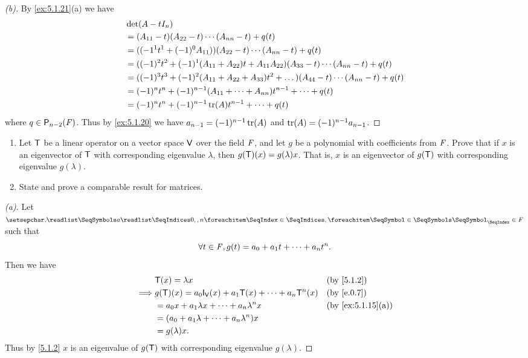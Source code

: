 \begin{proof}[(b)]
	By \cref{ex:5.1.21}(a) we have
	\begin{align*}
		 & \det(A - t I_n)                                                                                             \\
		 & = (A_{1 1} - t) (A_{2 2} - t) \cdots (A_{n n} - t) + q(t)                                                   \\
		 & = ((-1^1 t^1 + (-1)^0 A_{1 1})) (A_{2 2} - t) \cdots (A_{n n} - t) + q(t)                                   \\
		 & = ((-1)^2 t^2 + (-1)^1 (A_{1 1} + A_{2 2}) t + A_{1 1} A_{2 2}) (A_{3 3} - t) \cdots (A_{n n} - t) + q(t)   \\
		 & = ((-1)^3 t^3 + (-1)^2 (A_{1 1} + A_{2 2} + A_{3 3}) t^2 + \dots) (A_{4 4} - t) \cdots (A_{n n} - t) + q(t) \\
		 & = (-1)^n t^n + (-1)^{n - 1} (A_{1 1} + \cdots + A_{n n}) t^{n - 1} + \cdots + q(t)                          \\
		 & = (-1)^n t^n + (-1)^{n - 1} \tr(A) t^{n - 1} + \cdots + q(t)
	\end{align*}
	where \(q \in \ps[n - 2]{\F}\).
	Thus by \cref{ex:5.1.20} we have \(a_{n - 1} = (-1)^{n - 1} \tr(A)\) and \(\tr(A) = (-1)^{n - 1} a_{n - 1}\).
\end{proof}

\begin{ex}\label{ex:5.1.22}
	\begin{enumerate}
		\item Let \(\mathsf{T}\) be a linear operator on a vector space \(\mathsf{V}\) over the field \(\mathit{F}\), and let \(g\) be a polynomial with coefficients from \(\mathit{F}\).
		      Prove that if \(x\) is an eigenvector of \(\mathsf{T}\) with corresponding eigenvalue \(\lambda\), then \(g(\mathsf{T})(x) = g(\lambda) x\).
		      That is, \(x\) is an eigenvector of \(g(\mathsf{T})\) with corresponding eigenvalue \(g(\lambda)\).
		\item State and prove a comparable result for matrices.
	\end{enumerate}
\end{ex}

\begin{proof}[(a)]
	Let \(\seq{a}{0,,n} \in \F\) such that
	\[
		\forall t \in \mathit{F}, g(t) = a_0 + a_1 t + \cdots + a_n t^n.
	\]
	Then we have
	\begin{align*}
		         & \T(x) = \lambda x                                            &  & \by{5.1.2}        \\
		\implies & g(\T)(x) = a_0 \IT[\V](x) + a_1 \T(x) + \cdots + a_n \T^n(x) &  & \by{e.0.7}        \\
		         & = a_0 x + a_1 \lambda x + \cdots + a_n \lambda^n x           &  & \by{ex:5.1.15}[a] \\
		         & = (a_0 + a_1 \lambda + \cdots + a_n \lambda^n) x                                    \\
		         & = g(\lambda) x.
	\end{align*}
	Thus by \cref{5.1.2} \(x\) is an eigenvalue of \(g(\mathsf{T})\) with corresponding eigenvalue \(g(\lambda)\).
\end{proof}

